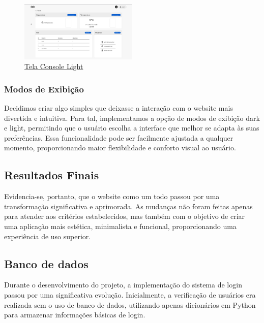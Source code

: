 \documentclass[conference, a4paper, 12pt]{IEEEtran}
\begin{document}
\begin{figure}[H]
  \begin{center}
    \includegraphics[width=0.5\textwidth]{tempo_real_lighmode_nova.png}
    \caption{\href{https://github.com/Lucas-LPG/gws/blob/develop/report/images/tempo_real_lighmode_nova.png}{Tela Console Light}}
  \end{center}
\end{figure}
\vspace{10pt}
\subsubsection{Modos de Exibição}

Decidimos criar algo simples que deixasse a interação com o website mais divertida e intuitiva. Para tal, implementamos a opção de modos de exibição dark e light, permitindo que o usuário escolha a interface que melhor se adapta às suas preferências. Essa funcionalidade pode ser facilmente ajustada a qualquer momento, proporcionando maior flexibilidade e conforto visual ao usuário.



\vspace{10pt}
\subsection{Resultados Finais}

Evidencia-se, portanto, que o website como um todo passou por uma transformação significativa e aprimorada. As mudanças não foram feitas apenas para atender aos critérios estabelecidos, mas também com o objetivo de criar uma aplicação mais estética, minimalista e funcional, proporcionando uma experiência de uso superior.

\subsection{Banco de dados}
Durante o desenvolvimento do projeto, a implementação do sistema de login passou por uma significativa evolução. Inicialmente, a verificação de usuários era realizada sem o uso de banco de dados, utilizando apenas dicionários em Python para armazenar informações básicas de login.
\end{document}

